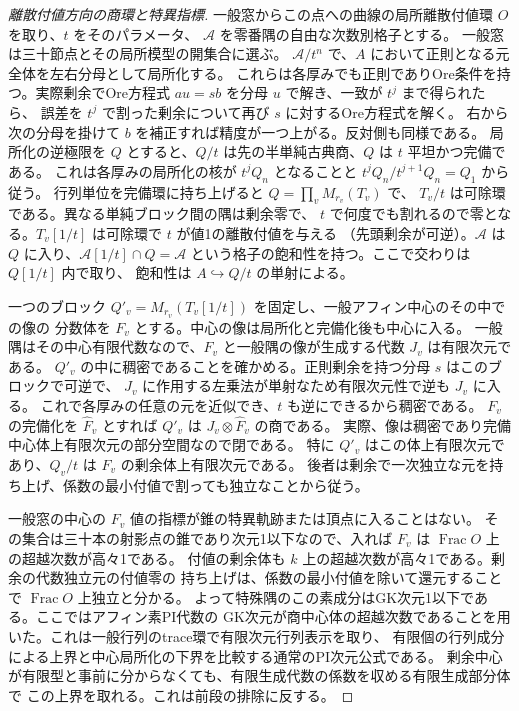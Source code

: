 \begin{proof}[離散付値方向の商環と特異指標]
一般窓からこの点への曲線の局所離散付値環 $O$ を取り、$t$ をそのパラメータ、
$\mathcal A$ を零番隅の自由な次数別格子とする。
一般窓は三十節点とその局所模型の開集合に選ぶ。
$\mathcal A/t^n$ で、$A$ において正則となる元全体を左右分母として局所化する。
これらは各厚みでも正則でありOre条件を持つ。実際剰余でOre方程式
$au=sb$ を分母 $u$ で解き、一致が $t^j$ まで得られたら、
誤差を $t^j$ で割った剰余について再び $s$ に対するOre方程式を解く。
右から次の分母を掛けて $b$ を補正すれば精度が一つ上がる。反対側も同様である。
局所化の逆極限を $Q$ とすると、$Q/t$ は先の半単純古典商、$Q$ は $t$ 平坦かつ完備である。
これは各厚みの局所化の核が $t^jQ_n$ となることと
$t^jQ_n/t^{j+1}Q_n=Q_1$ から従う。
行列単位を完備環に持ち上げると $Q=\prod_v M_{r_v}(T_v)$ で、
$T_v/t$ は可除環である。異なる単純ブロック間の隅は剰余零で、
$t$ で何度でも割れるので零となる。$T_v[1/t]$ は可除環で $t$ が値1の離散付値を与える
（先頭剰余が可逆）。$\mathcal A$ は $Q$ に入り、$\mathcal A[1/t]\cap Q=\mathcal A$
という格子の飽和性を持つ。ここで交わりは $Q[1/t]$ 内で取り、
飽和性は $A\hookrightarrow Q/t$ の単射による。

一つのブロック $Q'_v=M_{r_v}(T_v[1/t])$ を固定し、一般アフィン中心のその中での像の
分数体を $F_v$ とする。中心の像は局所化と完備化後も中心に入る。
一般隅はその中心有限代数なので、$F_v$ と一般隅の像が生成する代数 $J_v$ は有限次元である。
$Q'_v$ の中に稠密であることを確かめる。正則剰余を持つ分母 $s$ はこのブロックで可逆で、
$J_v$ に作用する左乗法が単射なため有限次元性で逆も $J_v$ に入る。
これで各厚みの任意の元を近似でき、$t$ も逆にできるから稠密である。
$F_v$ の完備化を $\widehat F_v$ とすれば $Q'_v$ は $J_v\otimes\widehat F_v$ の商である。
実際、像は稠密であり完備中心体上有限次元の部分空間なので閉である。
特に $Q'_v$ はこの体上有限次元であり、$Q_v/t$ は $F_v$ の剰余体上有限次元である。
後者は剰余で一次独立な元を持ち上げ、係数の最小付値で割っても独立なことから従う。

一般窓の中心の $F_v$ 値の指標が錐の特異軌跡または頂点に入ることはない。
その集合は三十本の射影点の錐であり次元1以下なので、入れば
$F_v$ は $\operatorname{Frac}O$ 上の超越次数が高々1である。
付値の剰余体も $k$ 上の超越次数が高々1である。剰余の代数独立元の付値零の
持ち上げは、係数の最小付値を除いて還元することで $\operatorname{Frac}O$ 上独立と分かる。
よって特殊隅のこの素成分はGK次元1以下である。ここではアフィン素PI代数の
GK次元が商中心体の超越次数であることを用いた。これは一般行列のtrace環で有限次元行列表示を取り、
有限個の行列成分による上界と中心局所化の下界を比較する通常のPI次元公式である。
剰余中心が有限型と事前に分からなくても、有限生成代数の係数を収める有限生成部分体で
この上界を取れる。これは前段の排除に反する。


\end{proof}

